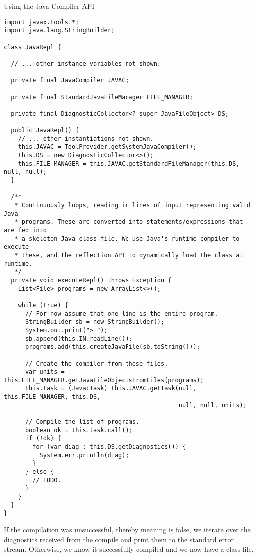 \begin{cl}[]{Using the Java Compiler API}
\begin{lstlisting}[language=MyJava]
import javax.tools.*;
import java.lang.StringBuilder;

class JavaRepl {

  // ... other instance variables not shown.

  private final JavaCompiler JAVAC;

  private final StandardJavaFileManager FILE_MANAGER;

  private final DiagnosticCollector<? super JavaFileObject> DS;

  public JavaRepl() {
    // ... other instantiations not shown.
    this.JAVAC = ToolProvider.getSystemJavaCompiler();
    this.DS = new DiagnosticCollector<>();
    this.FILE_MANAGER = this.JAVAC.getStandardFileManager(this.DS, null, null);
  }

  /**
   * Continuously loops, reading in lines of input representing valid Java
   * programs. These are converted into statements/expressions that are fed into
   * a skeleton Java class file. We use Java's runtime compiler to execute
   * these, and the reflection API to dynamically load the class at runtime.
   */
  private void executeRepl() throws Exception {
    List<File> programs = new ArrayList<>();

    while (true) {
      // For now assume that one line is the entire program.
      StringBuilder sb = new StringBuilder();
      System.out.print("> ");
      sb.append(this.IN.readLine());
      programs.add(this.createJavaFile(sb.toString()));

      // Create the compiler from these files.
      var units = this.FILE_MANAGER.getJavaFileObjectsFromFiles(programs);
      this.task = (JavacTask) this.JAVAC.getTask(null, this.FILE_MANAGER, this.DS,
                                                 null, null, units);

      // Compile the list of programs.
      boolean ok = this.task.call();
      if (!ok) {
        for (var diag : this.DS.getDiagnostics()) {
          System.err.println(diag);
        }
      } else {
        // TODO.
      }
    }
  }
}
\end{lstlisting}
\end{cl}

If the compilation was unsuccessful, thereby meaning  is false, we iterate over the diagnostics received from the compile and print them to the standard error stream. Otherwise, we know it successfully compiled and we now have a class file.


